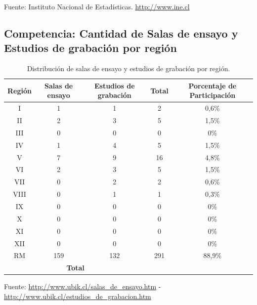  Fuente: Instituto Nacional de Estadísticas. \url{http://www.ine.cl}

\newpage
\subsection{Competencia: Cantidad de Salas de ensayo y Estudios de grabación por región}
\begin{table}[htb!]
\centering
	\begin{tabular}{|c|c|c|c|c|}
	\hline
	\textbf{Región} & \textbf{Salas de ensayo} & \textbf{Estudios de grabación} & \textbf{Total} & \textbf{Porcentaje de Participación}\\
	\hline
	I 		& 1	& 1	& 2	&0,6\%\\
	II		& 2	& 3	& 5	&1,5\%\\
	III 		& 0	& 0	& 0	&0\%\\
	IV 		& 1 	& 4	& 5	&1,5\%\\	
	V		& 7	& 9	& 16	&4,8\%\\
	VI 		& 2	& 3	& 5	&1,5\%\\
	VII		& 0	& 2	& 2	&0,6\%\\	
	VIII 		& 0	& 1	& 1	&0,3\%\\
	IX 		& 0	& 0	& 0	&0\%\\
	X 		& 0 	& 0	& 0	&0\%\\
	XI 		& 0	& 0	& 0	&0\%\\
	XII 		& 0	& 0	& 0	&0\%\\
	RM 		&159	& 132	& 291	&88,9\%\\
	\hline
	\multicolumn{3}{|c|}{\textbf{Total}} & \multicolumn{1}{|c|}{\blue{327}} & \\
	\hline
	\end{tabular}
\caption{Distribución de salas de ensayo y estudios de grabación por región.}
\end{table}

Fuente: \url{http://www.ubik.cl/salas_de_ensayo.htm} - \url{http://www.ubik.cl/estudios_de_grabacion.htm} 
\newpage
